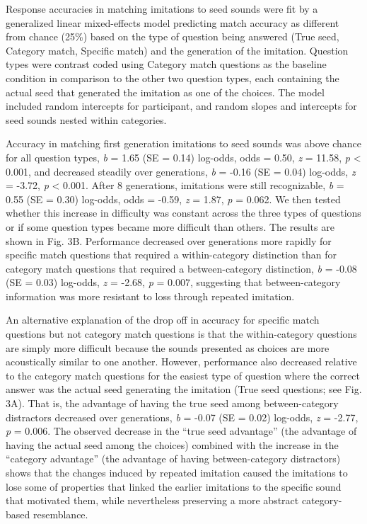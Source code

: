 \documentclass[english,floatsintext,man]{apa6}
\theoremstyle{definition}
\theoremstyle{definition}
\theoremstyle{definition}
\theoremstyle{remark}
\begin{document}
Response accuracies in matching imitations to seed sounds were fit by a
generalized linear mixed-effects model predicting match accuracy as
different from chance (25\%) based on the type of question being
answered (True seed, Category match, Specific match) and the generation
of the imitation. Question types were contrast coded using Category
match questions as the baseline condition in comparison to the other two
question types, each containing the actual seed that generated the
imitation as one of the choices. The model included random intercepts
for participant, and random slopes and intercepts for seed sounds nested
within categories.

Accuracy in matching first generation imitations to seed sounds was
above chance for all question types, \emph{b} = 1.65 (SE = 0.14)
log-odds, odds = 0.50, \emph{z} = 11.58, \emph{p} \textless{} 0.001, and
decreased steadily over generations, \emph{b} = -0.16 (SE = 0.04)
log-odds, \emph{z} = -3.72, \emph{p} \textless{} 0.001. After 8
generations, imitations were still recognizable, \emph{b} = 0.55 (SE =
0.30) log-odds, odds = -0.59, \emph{z} = 1.87, \emph{p} = 0.062. We then
tested whether this increase in difficulty was constant across the three
types of questions or if some question types became more difficult than
others. The results are shown in Fig. 3B. Performance decreased over
generations more rapidly for specific match questions that required a
within-category distinction than for category match questions that
required a between-category distinction, \emph{b} = -0.08 (SE = 0.03)
log-odds, \emph{z} = -2.68, \emph{p} = 0.007, suggesting that
between-category information was more resistant to loss through repeated
imitation.

An alternative explanation of the drop off in accuracy for specific
match questions but not category match questions is that the
within-category questions are simply more difficult because the sounds
presented as choices are more acoustically similar to one another.
However, performance also decreased relative to the category match
questions for the easiest type of question where the correct answer was
the actual seed generating the imitation (True seed questions; see Fig.
3A). That is, the advantage of having the true seed among
between-category distractors decreased over generations, \emph{b} =
-0.07 (SE = 0.02) log-odds, \emph{z} = -2.77, \emph{p} = 0.006. The
observed decrease in the \enquote{true seed advantage} (the advantage of
having the actual seed among the choices) combined with the increase in
the \enquote{category advantage} (the advantage of having
between-category distractors) shows that the changes induced by repeated
imitation caused the imitations to lose some of properties that linked
the earlier imitations to the specific sound that motivated them, while
nevertheless preserving a more abstract category-based resemblance.
\end{document}

